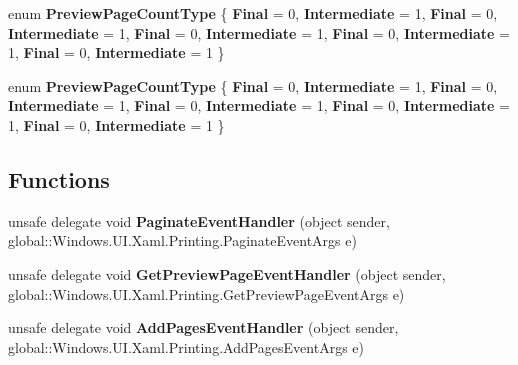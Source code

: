 \begin{DoxyCompactItemize}
enum {\bfseries Preview\+Page\+Count\+Type} \{ \newline
{\bfseries Final} = 0, 
{\bfseries Intermediate} = 1, 
{\bfseries Final} = 0, 
{\bfseries Intermediate} = 1, 
\newline
{\bfseries Final} = 0, 
{\bfseries Intermediate} = 1, 
{\bfseries Final} = 0, 
{\bfseries Intermediate} = 1, 
\newline
{\bfseries Final} = 0, 
{\bfseries Intermediate} = 1
 \}
\item 
\mbox{\label{namespace_windows_1_1_u_i_1_1_xaml_1_1_printing_a8e55bb45ae8ef08104a1dea745ce36d3}} 
enum {\bfseries Preview\+Page\+Count\+Type} \{ \newline
{\bfseries Final} = 0, 
{\bfseries Intermediate} = 1, 
{\bfseries Final} = 0, 
{\bfseries Intermediate} = 1, 
\newline
{\bfseries Final} = 0, 
{\bfseries Intermediate} = 1, 
{\bfseries Final} = 0, 
{\bfseries Intermediate} = 1, 
\newline
{\bfseries Final} = 0, 
{\bfseries Intermediate} = 1
 \}
\end{DoxyCompactItemize}
\subsection*{Functions}
\begin{DoxyCompactItemize}
\item 
\mbox{\label{namespace_windows_1_1_u_i_1_1_xaml_1_1_printing_a5ccc674e8b90cfd4066dfafe3631461a}} 
unsafe delegate void {\bfseries Paginate\+Event\+Handler} (object sender, global\+::\+Windows.\+U\+I.\+Xaml.\+Printing.\+Paginate\+Event\+Args e)
\item 
\mbox{\label{namespace_windows_1_1_u_i_1_1_xaml_1_1_printing_a455d1d7a9688fd4cdc90caee441e9fc3}} 
unsafe delegate void {\bfseries Get\+Preview\+Page\+Event\+Handler} (object sender, global\+::\+Windows.\+U\+I.\+Xaml.\+Printing.\+Get\+Preview\+Page\+Event\+Args e)
\item 
\mbox{\label{namespace_windows_1_1_u_i_1_1_xaml_1_1_printing_a09d640d228d2a920f7ff6e51713ab4ec}} 
unsafe delegate void {\bfseries Add\+Pages\+Event\+Handler} (object sender, global\+::\+Windows.\+U\+I.\+Xaml.\+Printing.\+Add\+Pages\+Event\+Args e)
\end{DoxyCompactItemize}
